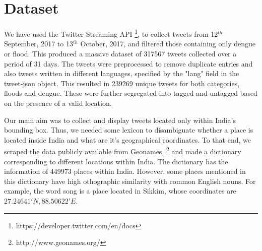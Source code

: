 \documentclass[journal, a4paper]{IEEEtran}
\begin{document}
\section{Dataset}
We have used the Twitter Streaming API \footnote{https://developer.twitter.com/en/docs}, to collect tweets from 12$^{th}$ September, 2017 to 13$^{th}$ October, 2017, and filtered those containing only dengue or flood. This produced a massive dataset of 317567 tweets collected over a period of 31 days. The tweets were preprocessed to remove duplicate entries and also tweets written in different languages, specified by the "lang" field in the tweet-json object. This resulted in 239269 unique tweets for both categories, floods and dengue. These were further segregated into tagged and untagged based on the presence of a valid location.

Our main aim was to collect and display tweets located only within India's bounding box. Thus, we needed some lexicon to disambiguate whether a place is located inside India and what are it's geographical coordinates. To that end, we scraped the data publicly available from Geonames, \footnote{http://www.geonames.org/} and made a dictionary corresponding to different locations within India. The dictionary has the information of 449973 places within India. However, some places mentioned in this dictionary have high othographic similarity with common English nouns. For example, the word song is a place located in Sikkim, whose coordinates are \(27.24641 'N, 88.50622 'E\).
\end{document}
